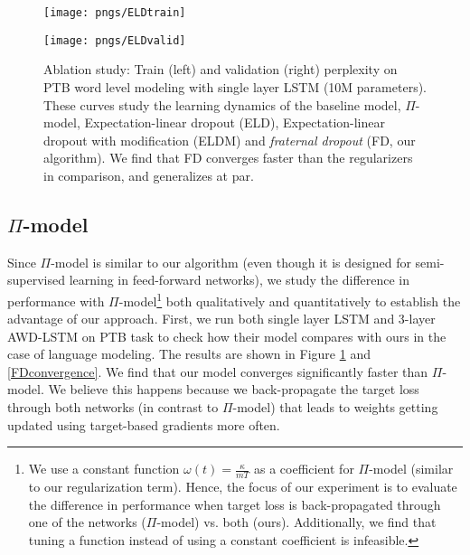 \documentclass{article} %
\begin{document}
\begin{figure}[t]
\vspace{-0.08cm}
  \centering
  \begin{minipage}[b]{0.48\textwidth}
    \texttt{[image: pngs/ELDtrain]}
  \end{minipage}
  \hfill
  \begin{minipage}[b]{0.48\textwidth}
    \texttt{[image: pngs/ELDvalid]}
  \end{minipage}
  \caption{Ablation study: Train (left) and validation (right) perplexity on PTB word level modeling with single layer LSTM (10M parameters). These curves study the learning dynamics of the baseline model, $\Pi$-model, Expectation-linear dropout (ELD), Expectation-linear dropout with modification (ELDM) and \emph{fraternal dropout} (FD, our algorithm). We find that FD converges faster than the regularizers in comparison, and generalizes at par.}
\vspace{-0.08cm}
\label{fig_pi_model}
\end{figure}

\subsection{\texorpdfstring{$\Pi$}{TEXT}-model}\label{semisupervised}
Since $\Pi$-model \cite{laine2016temporal} is similar to our algorithm (even though it is designed for semi-supervised learning in feed-forward networks), we study the difference in performance with $\Pi$-model\footnote{We use a constant function $\omega(t) = \frac{\kappa}{mT}$ as a coefficient for $\Pi$-model (similar to our regularization term). Hence, the focus of our experiment is to evaluate the difference in performance when target loss is back-propagated through one of the networks ($\Pi$-model) vs. both (ours). Additionally, we find that tuning a function instead of using a constant coefficient is infeasible.} both qualitatively and quantitatively to establish the advantage of our approach. First, we run both single layer LSTM and 3-layer AWD-LSTM on PTB task to check how their model compares with ours in the case of language modeling. The results are shown in Figure \ref{fig_pi_model} and \ref{FDconvergence}. We find that our model converges significantly faster than $\Pi$-model. We believe this happens because we back-propagate the target loss through both networks (in contrast to $\Pi$-model) that leads to weights getting updated using target-based gradients more often. 
\end{document}
